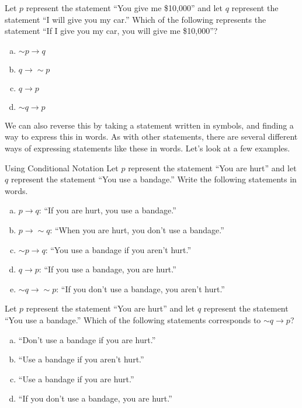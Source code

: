 \begin{try}
Let $p$ represent the statement ``You give me \$10,000'' and let $q$ represent the statement ``I will give you my car.''  Which of the following  represents the statement ``If I give you my car, you will give me \$10,000''?
\begin{enumerate}[(a)]
\item $\sim p \to q$
\item $q \to \sim p$
\item $q \to p$
\item $\sim q \to p$
\end{enumerate}
\end{try}

We can also reverse this by taking a statement written in symbols, and finding a way to express this in words.  As with other statements, there are several different ways of expressing statements like these in words.  Let's look at a few examples.

\begin{example}[https://www.youtube.com/watch?v=loZvvBM3BZk]{Using Conditional Notation}
Let $p$ represent the statement ``You are hurt'' and let $q$ represent the statement ``You use a bandage.''  Write the following statements in words.
\begin{enumerate}[(a)]
\item $p \to q$: ``If you are hurt, you use a bandage.''
\item $p \to \sim q$: ``When you are hurt, you don't use a bandage.''
\item $\sim p \to q$: ``You use a bandage if you aren't hurt.''
\item $q \to p$: ``If you use a bandage, you are hurt.''
\item $\sim q \to \sim p$: ``If you don't use a bandage, you aren't hurt.''
\end{enumerate}
\end{example}

\begin{try}
Let $p$ represent the statement ``You are hurt'' and let $q$ represent the statement ``You use a bandage.''  Which of the following statements corresponds to $\sim q \to p$?
\begin{enumerate}[(a)]
\item ``Don't use a bandage if you are hurt.''
\item ``Use a bandage if you aren't hurt.''
\item ``Use a bandage if you are hurt.''
\item ``If you don't use a bandage, you are hurt.''
\end{enumerate}
\end{try}

